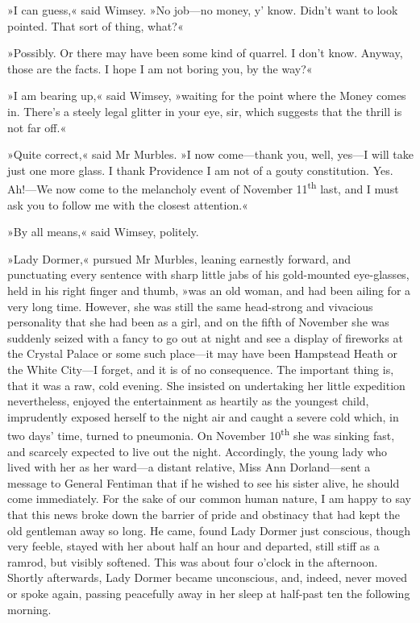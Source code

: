 »I can guess,« said Wimsey. »No job\allowbreak---\allowbreak no money, y' know. Didn't want to look pointed. That sort of thing, what?«

»Possibly. Or there may have been some kind of quarrel. I don't know. Anyway, those are the facts. I hope I am not boring you, by the way?«

»I am bearing up,« said Wimsey, »waiting for the point where the Money comes in. There's a steely legal glitter in your eye, sir, which suggests that the thrill is not far off.«

»Quite correct,« said Mr Murbles. »I now come\allowbreak---\allowbreak thank you, well, yes\allowbreak---\allowbreak I will take just one more glass. I thank Providence I am not of a gouty constitution. Yes. Ah!\allowbreak---\allowbreak We now come to the melancholy event of November 11\textsuperscript{th} last, and I must ask you to follow me with the closest attention.«

»By all means,« said Wimsey, politely.

»Lady Dormer,« pursued Mr Murbles, leaning earnestly forward, and punctuating every sentence with sharp little jabs of his gold-mounted eye-glasses, held in his right finger and thumb, »was an old woman, and had been ailing for a very long time. However, she was still the same head-strong and vivacious personality that she had been as a girl, and on the fifth of November she was suddenly seized with a fancy to go out at night and see a display of fireworks at the Crystal Palace or some such place\allowbreak---\allowbreak it may have been Hampstead Heath or the White City\allowbreak---\allowbreak I forget, and it is of no consequence. The important thing is, that it was a raw, cold evening. She insisted on undertaking her little expedition nevertheless, enjoyed the entertainment as heartily as the youngest child, imprudently exposed herself to the night air and caught a severe cold which, in two days' time, turned to pneumonia. On November  10\textsuperscript{th} she was sinking fast, and scarcely expected to live out the night. Accordingly, the young lady who lived with her as her ward\allowbreak---\allowbreak a distant relative, Miss Ann Dorland\allowbreak---\allowbreak sent a message to General Fentiman that if he wished to see his sister alive, he should come immediately. For the sake of our common human nature, I am happy to say that this news broke down the barrier of pride and obstinacy that had kept the old gentleman away so long. He came, found Lady Dormer just conscious, though very feeble, stayed with her about half an hour and departed, still stiff as a ramrod, but visibly softened. This was about four o'clock in the afternoon. Shortly afterwards, Lady Dormer became unconscious, and, indeed, never moved or spoke again, passing peacefully away in her sleep at half-past ten the following morning.

